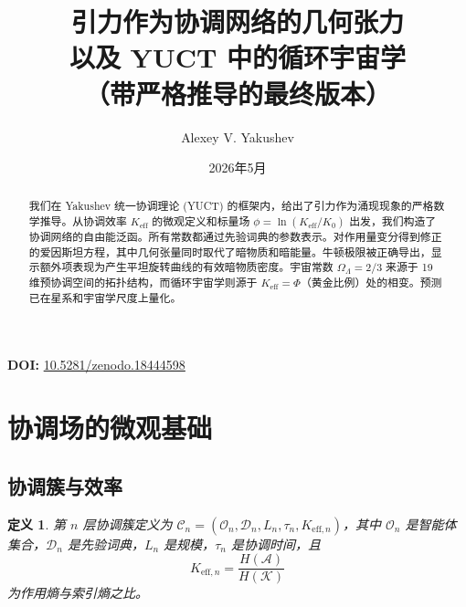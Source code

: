 \documentclass[12pt,a4paper]{article}
\title{\bfseries 引力作为协调网络的几何张力\\
	以及 YUCT 中的循环宇宙学\\
	（带严格推导的最终版本）}
\author{Alexey V. Yakushev}
\date{2026年5月}
\newtheorem{definition}[theorem]{定义}
\newcommand{\Dir}{\mathcal{D}}
\begin{document}
	\maketitle
	
	\vspace{0.5cm}
	\begin{center}
		\textbf{DOI:} \href{https://doi.org/10.5281/zenodo.18444598}{10.5281/zenodo.18444598}
	\end{center}
	\vspace{0.2cm}
	
	\begin{abstract}
		我们在 Yakushev 统一协调理论 (YUCT) 的框架内，给出了引力作为涌现现象的严格数学推导。从协调效率 \(K_{\mathrm{eff}}\) 的微观定义和标量场 \(\phi = \ln (K_{\mathrm{eff}}/K_0)\) 出发，我们构造了协调网络的自由能泛函。所有常数都通过先验词典的参数表示。对作用量变分得到修正的爱因斯坦方程，其中几何张量同时取代了暗物质和暗能量。牛顿极限被正确导出，显示额外项表现为产生平坦旋转曲线的有效暗物质密度。宇宙常数 \(\Omega_\Lambda = 2/3\) 来源于 19 维预协调空间的拓扑结构，而循环宇宙学则源于 \(K_{\mathrm{eff}} = \Phi\)（黄金比例）处的相变。预测已在星系和宇宙学尺度上量化。
	\end{abstract}
	
		
	\tableofcontents
	
	\section{协调场的微观基础}
	
	\subsection{协调簇与效率}
	\begin{definition}
		第 \(n\) 层协调簇定义为 \(\mathcal{C}_n = (\mathcal{O}_n, \Dir_n, L_n, \tau_n, K_{\mathrm{eff},n})\)，其中 \(\mathcal{O}_n\) 是智能体集合，\(\Dir_n\) 是先验词典，\(L_n\) 是规模，\(\tau_n\) 是协调时间，且
		\[
		K_{\mathrm{eff},n} = \frac{H(\mathcal{A})}{H(\mathcal{K})}
		\]
		为作用熵与索引熵之比。
	\end{definition}
	
\end{document}
